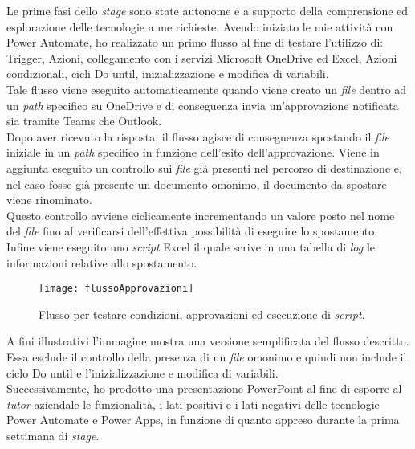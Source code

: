 Le prime fasi dello \emph{stage} sono state autonome e a supporto della comprensione ed esplorazione delle tecnologie a me richieste. 
Avendo iniziato le mie attività con Power Automate, ho realizzato un primo flusso al fine di testare l'utilizzo di: Trigger, Azioni, collegamento con i servizi Microsoft OneDrive ed Excel, Azioni condizionali, cicli Do until, inizializzazione e modifica di variabili.\\
Tale flusso viene eseguito automaticamente quando viene creato un \emph{file} dentro ad un \emph{path} specifico su OneDrive e di conseguenza invia un'approvazione notificata sia tramite Teams che Outlook.\\
Dopo aver ricevuto la risposta, il flusso agisce di conseguenza spostando il \emph{file} iniziale in un \emph{path} specifico in funzione dell'esito dell'approvazione.
Viene in aggiunta eseguito un controllo sui \emph{file} già presenti nel percorso di destinazione e, nel caso fosse già presente un documento omonimo, il documento da spostare viene rinominato.\\
Questo controllo avviene ciclicamente incrementando un valore posto nel nome del \emph{file} fino al verificarsi dell'effettiva possibilità di eseguire lo spostamento.\\
Infine viene eseguito uno \emph{script} Excel il quale scrive in una tabella di \emph{log} le informazioni relative allo spostamento.
\begin{figure}[htbp] 
    \centering 
    \texttt{[image: flussoApprovazioni]} 
    \caption{Flusso per testare condizioni, approvazioni ed esecuzione di \emph{script}.}
    \label{fig:flussoApprovazioni}
\end{figure}
\newline \noindent A fini illustrativi l'immagine mostra una versione semplificata del flusso descritto. Essa esclude il controllo della presenza di un \emph{file} omonimo e quindi non include il ciclo Do until e l'inizializzazione e modifica di variabili.\\
Successivamente, ho prodotto una presentazione PowerPoint al fine di esporre al \emph{\emph{tutor}} aziendale le funzionalità, i lati positivi e i lati negativi delle tecnologie Power Automate e Power Apps, in funzione di quanto appreso durante la prima settimana di \emph{stage}.



